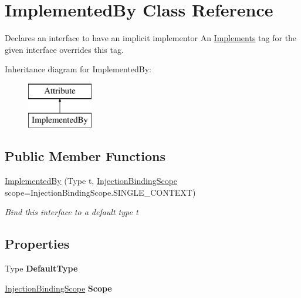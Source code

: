 \hypertarget{class_implemented_by}{\section{Implemented\-By Class Reference}
\label{class_implemented_by}
}


Declares an interface to have an implicit implementor An \hyperlink{class_implements}{Implements} tag for the given interface overrides this tag.  


Inheritance diagram for Implemented\-By\-:\begin{figure}[H]
\begin{center}
\leavevmode
\includegraphics[height=2.000000cm]{class_implemented_by}
\end{center}
\end{figure}
\subsection*{Public Member Functions}
\begin{DoxyCompactItemize}
\item 
\hyperlink{class_implemented_by_ac7136e1f5c12273c718886f0b24bb864}{Implemented\-By} (Type t, \hyperlink{namespacestrange_1_1extensions_1_1injector_1_1api_ab0f6d151014ae36671ff9f98e77fbf58}{Injection\-Binding\-Scope} scope=Injection\-Binding\-Scope.\-S\-I\-N\-G\-L\-E\-\_\-\-C\-O\-N\-T\-E\-X\-T)
\begin{DoxyCompactList}\small\item\em Bind this interface to a default type t \end{DoxyCompactList}\end{DoxyCompactItemize}
\subsection*{Properties}
\begin{DoxyCompactItemize}
\item 
\hypertarget{class_implemented_by_a3f78e0f125204066361502e741b8fe00}{Type {\bfseries Default\-Type}}\label{class_implemented_by_a3f78e0f125204066361502e741b8fe00}

\item 
\hypertarget{class_implemented_by_ad7bd3d693bc6b0bb848ac7c3dd5a6267}{\hyperlink{namespacestrange_1_1extensions_1_1injector_1_1api_ab0f6d151014ae36671ff9f98e77fbf58}{Injection\-Binding\-Scope} {\bfseries Scope}}\label{class_implemented_by_ad7bd3d693bc6b0bb848ac7c3dd5a6267}

\end{DoxyCompactItemize}


